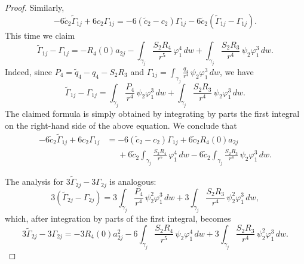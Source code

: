 \begin{proof}
Similarly,
\[ -6\tilde{c}_2\widetilde{\Gamma}_{1j}+6c_2\Gamma_{1j}=-6(\tilde{c}_2-c_2)\Gamma_{1j}-6\tilde{c}_2(\widetilde{\Gamma}_{1j}-\Gamma_{1j}). \]
This time we claim
\begin{equation}\label{formula:Gamma1t-Gamma1}
 \widetilde{\Gamma}_{1j}-\Gamma_{1j}=-R_4(0)a_{2j}-\int_{\gamma_j}\frac{S_2R_4}{r^5}\,\varphi_1^4\,dw+\int_{\gamma_j}\frac{S_2R_3}{r^4}\,\psi_2\varphi_1^3\,dw.
\end{equation}
Indeed, since $P_4=\tilde{q}_4-q_4-S_2R_3$ and $\Gamma_{1j}=\int_{\gamma_j}\frac{q_4}{r^4}\,\psi_2\varphi_1^3\,dw$, we have
\[ \widetilde{\Gamma}_{1j}-\Gamma_{1j}=\int_{\gamma_j}\frac{P_4}{r^4}\,\psi_2\varphi_1^3\,dw+\int_{\gamma_j}\frac{S_2R_3}{r^4}\,\psi_2\varphi_1^3\,dw. \]
The claimed formula is simply obtained by integrating by parts the first integral on the right-hand side of the above equation. We conclude that
\begin{align}
-6\tilde{c}_2\widetilde{\Gamma}_{1j}+6c_2\Gamma_{1j} &= -6(\tilde{c}_2-c_2)\Gamma_{1j}+6\tilde{c}_2R_4(0)a_{2j} \nonumber \\
&\phantom{=} + 6\tilde{c}_2\int_{\gamma_j}\frac{S_2R_4}{r^5}\,\varphi_1^4\,dw-6\tilde{c}_2\int_{\gamma_j}\frac{S_2R_3}{r^4}\,\psi_2\varphi_1^3\,dw. \label{eq:Gamma1t-Gamma1}
\end{align}

The analysis for $3\widetilde{\Gamma}_{2j}-3\Gamma_{2j}$ is analogous:
\[ 3(\widetilde{\Gamma}_{2j}-\Gamma_{2j})=3\int_{\gamma_j}\frac{P_4}{r^4}\,\psi_2^2\varphi_1^3\,dw+3\int_{\gamma_j}\frac{S_2R_3}{r^4}\,\psi_2^2\varphi_1^3\,dw,\]
which, after integration by parts of the first integral, becomes
\begin{equation}\label{eq:Gamma2t-Gamma2}
 3\widetilde{\Gamma}_{2j}-3\Gamma_{2j}=-3R_4(0)a_{2j}^2 -6\int_{\gamma_j}\frac{S_2R_4}{r^5}\,\psi_2\varphi_1^4\,dw +3\int_{\gamma_j}\frac{S_2R_3}{r^4}\,\psi_2^2\varphi_1^3\,dw.
\end{equation}


\end{proof}
